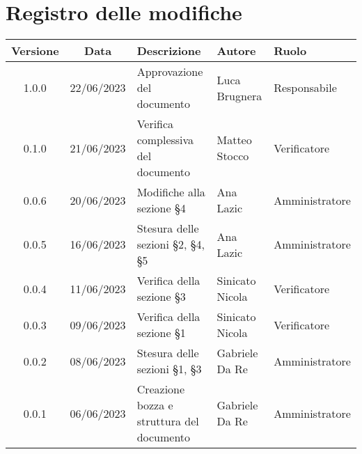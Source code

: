\section*{Registro delle modifiche}
\begin{center}
\setlength\extrarowheight{5pt}
\renewcommand\tabularxcolumn[1]{>{\Centering}m{#1}}
\begin{tabularx}{\textwidth}{| c | c | X | X | X |} 
	\hline
	\rowcolor{white}
	\textbf{Versione} & \textbf{Data} & \textbf{Descrizione} & \textbf{Autore} & \textbf{Ruolo}\\
	\hline
	1.0.0 & 22/06/2023 & Approvazione del documento & Luca Brugnera & Responsabile\\
	\hline
	0.1.0 & 21/06/2023 & Verifica complessiva del documento & Matteo Stocco & Verificatore\\
	\hline
	0.0.6 & 20/06/2023 & Modifiche alla sezione §4 & Ana Lazic & Amministratore\\
	\hline
	0.0.5 & 16/06/2023 & Stesura delle sezioni §2, §4, §5  & Ana Lazic & Amministratore\\
 \hline
	0.0.4 & 11/06/2023 & Verifica della sezione §3 & Sinicato Nicola & Verificatore\\
 \hline
	0.0.3 & 09/06/2023 & Verifica della sezione §1 & Sinicato Nicola & Verificatore\\
	\hline
	0.0.2 & 08/06/2023 & Stesura delle sezioni §1, §3 & Gabriele Da Re & Amministratore\\
	\hline
	0.0.1 & 06/06/2023 & Creazione bozza e struttura del documento & Gabriele Da Re & Amministratore\\
	\hline
	\end{tabularx}
\end{center}
